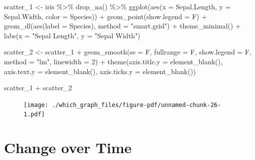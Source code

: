 \documentclass[
  letterpaper,
]{book}
\newenvironment{Shaded}{\begin{snugshade}}{\end{snugshade}}
\newcommand{\AttributeTok}[1]{\textcolor[rgb]{0.40,0.45,0.13}{#1}}
\newcommand{\DecValTok}[1]{\textcolor[rgb]{0.68,0.00,0.00}{#1}}
\newcommand{\FunctionTok}[1]{\textcolor[rgb]{0.28,0.35,0.67}{#1}}
\newcommand{\NormalTok}[1]{\textcolor[rgb]{0.00,0.23,0.31}{#1}}
\newcommand{\OtherTok}[1]{\textcolor[rgb]{0.00,0.23,0.31}{#1}}
\newcommand{\SpecialCharTok}[1]{\textcolor[rgb]{0.37,0.37,0.37}{#1}}
\newcommand{\StringTok}[1]{\textcolor[rgb]{0.13,0.47,0.30}{#1}}
\begin{document}
\begin{Shaded}
\begin{Highlighting}[]
\NormalTok{scatter\_1 }\OtherTok{\textless{}{-}}\NormalTok{ iris }\SpecialCharTok{\%\textgreater{}\%} \FunctionTok{drop\_na}\NormalTok{() }\SpecialCharTok{\%\textgreater{}\%} \FunctionTok{ggplot}\NormalTok{(}\FunctionTok{aes}\NormalTok{(}\AttributeTok{x =}\NormalTok{ Sepal.Length, }\AttributeTok{y =}\NormalTok{ Sepal.Width, }\AttributeTok{color =}\NormalTok{ Species)) }\SpecialCharTok{+} 
  \FunctionTok{geom\_point}\NormalTok{(}\AttributeTok{show.legend =}\NormalTok{ F) }\SpecialCharTok{+} 
  \FunctionTok{geom\_dl}\NormalTok{(}\FunctionTok{aes}\NormalTok{(}\AttributeTok{label =}\NormalTok{ Species), }\AttributeTok{method =} \StringTok{"smart.grid"}\NormalTok{) }\SpecialCharTok{+} 
  \FunctionTok{theme\_minimal}\NormalTok{() }\SpecialCharTok{+} 
  \FunctionTok{labs}\NormalTok{(}\AttributeTok{x =} \StringTok{"Sepal Length"}\NormalTok{, }\AttributeTok{y =} \StringTok{"Sepal Width"}\NormalTok{)}

\NormalTok{scatter\_2 }\OtherTok{\textless{}{-}}\NormalTok{ scatter\_1 }\SpecialCharTok{+} \FunctionTok{geom\_smooth}\NormalTok{(}\AttributeTok{se =}\NormalTok{ F, }\AttributeTok{fullrange =}\NormalTok{ F, }\AttributeTok{show.legend =}\NormalTok{ F, }\AttributeTok{method =} \StringTok{"lm"}\NormalTok{, }\AttributeTok{linewidth =} \DecValTok{2}\NormalTok{) }\SpecialCharTok{+} \FunctionTok{theme}\NormalTok{(}\AttributeTok{axis.title.y =} \FunctionTok{element\_blank}\NormalTok{(),}
        \AttributeTok{axis.text.y =} \FunctionTok{element\_blank}\NormalTok{(),}
        \AttributeTok{axis.ticks.y =} \FunctionTok{element\_blank}\NormalTok{())}

\NormalTok{scatter\_1 }\SpecialCharTok{+}\NormalTok{ scatter\_2}
\end{Highlighting}
\end{Shaded}

\begin{figure}[H]

{\centering \texttt{[image: ./which\_graph\_files/figure-pdf/unnamed-chunk-26-1.pdf]}

}

\end{figure}

\hypertarget{change-over-time}{%
\section{Change over Time}\label{change-over-time}}
\end{document}
